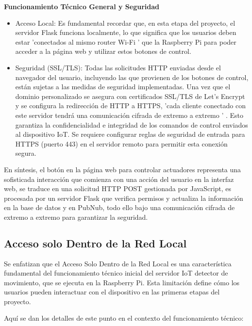 \documentclass{report}
\begin{document}
\textbf{Funcionamiento Técnico General y Seguridad}
\begin{itemize}
    \item Acceso Local:  Es fundamental recordar que, en esta etapa del proyecto, el servidor Flask funciona localmente, lo que significa que los 
    usuarios deben estar   'conectados al mismo router Wi-Fi '  que la Raspberry Pi para poder acceder a la página web y utilizar estos botones de control.
    \item Seguridad (SSL/TLS):  Todas las solicitudes HTTP enviadas desde el navegador del usuario, incluyendo las que provienen de los botones de control, 
    están sujetas a las medidas de seguridad implementadas. Una vez que el dominio personalizado se asegura con certificados SSL/TLS de Let's Encrypt y se configura la redirección de HTTP a HTTPS,   'cada cliente conectado con este servidor tendrá una comunicación cifrada de extremo a extremo ' . Esto garantiza la confidencialidad e integridad de los comandos de control enviados al dispositivo IoT. Se requiere configurar reglas de seguridad de entrada para HTTPS (puerto 443) en el servidor remoto para permitir esta conexión segura.
\end{itemize}
En síntesis, el  botón en la página web para controlar actuadores  representa una sofisticada interacción que comienza con una acción del usuario en la 
interfaz web, se traduce en una solicitud HTTP POST gestionada por JavaScript, es procesada por un servidor Flask que verifica permisos y actualiza 
la información en la base de datos y en PubNub, todo ello bajo una  comunicación cifrada de extremo a extremo  para garantizar la seguridad.

\subsection{Acceso solo Dentro de la Red Local}
Se enfatizan que el  Acceso Solo Dentro de la Red Local  es una característica fundamental del funcionamiento 
técnico inicial del servidor IoT detector de movimiento, que se ejecuta en la Raspberry Pi. Esta limitación define cómo los usuarios pueden interactuar 
con el dispositivo en las primeras etapas del proyecto.

Aquí se dan los detalles de este punto en el contexto del funcionamiento técnico:
\end{document}

